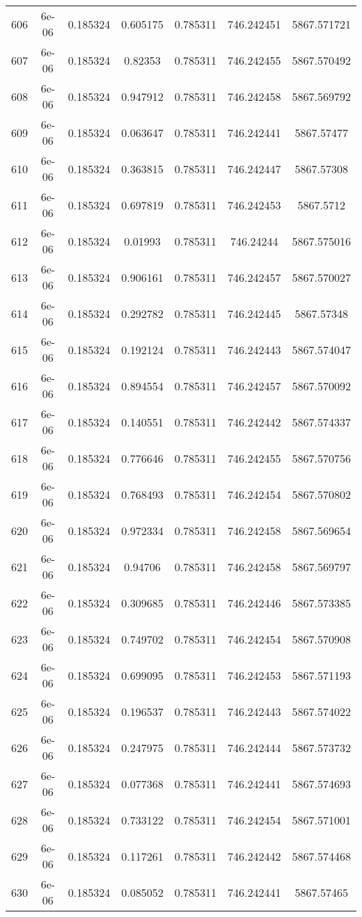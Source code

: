 \begin{table}
\begin{tabular*}{\linewidth}{c|c|c|c|c|c|c}
606 & 6e-06 & 0.185324 & 0.605175 & 0.785311 & 746.242451 & 5867.571721\\
607 & 6e-06 & 0.185324 & 0.82353 & 0.785311 & 746.242455 & 5867.570492\\
608 & 6e-06 & 0.185324 & 0.947912 & 0.785311 & 746.242458 & 5867.569792\\
609 & 6e-06 & 0.185324 & 0.063647 & 0.785311 & 746.242441 & 5867.57477\\
610 & 6e-06 & 0.185324 & 0.363815 & 0.785311 & 746.242447 & 5867.57308\\
611 & 6e-06 & 0.185324 & 0.697819 & 0.785311 & 746.242453 & 5867.5712\\
612 & 6e-06 & 0.185324 & 0.01993 & 0.785311 & 746.24244 & 5867.575016\\
613 & 6e-06 & 0.185324 & 0.906161 & 0.785311 & 746.242457 & 5867.570027\\
614 & 6e-06 & 0.185324 & 0.292782 & 0.785311 & 746.242445 & 5867.57348\\
615 & 6e-06 & 0.185324 & 0.192124 & 0.785311 & 746.242443 & 5867.574047\\
616 & 6e-06 & 0.185324 & 0.894554 & 0.785311 & 746.242457 & 5867.570092\\
617 & 6e-06 & 0.185324 & 0.140551 & 0.785311 & 746.242442 & 5867.574337\\
618 & 6e-06 & 0.185324 & 0.776646 & 0.785311 & 746.242455 & 5867.570756\\
619 & 6e-06 & 0.185324 & 0.768493 & 0.785311 & 746.242454 & 5867.570802\\
620 & 6e-06 & 0.185324 & 0.972334 & 0.785311 & 746.242458 & 5867.569654\\
621 & 6e-06 & 0.185324 & 0.94706 & 0.785311 & 746.242458 & 5867.569797\\
622 & 6e-06 & 0.185324 & 0.309685 & 0.785311 & 746.242446 & 5867.573385\\
623 & 6e-06 & 0.185324 & 0.749702 & 0.785311 & 746.242454 & 5867.570908\\
624 & 6e-06 & 0.185324 & 0.699095 & 0.785311 & 746.242453 & 5867.571193\\
625 & 6e-06 & 0.185324 & 0.196537 & 0.785311 & 746.242443 & 5867.574022\\
626 & 6e-06 & 0.185324 & 0.247975 & 0.785311 & 746.242444 & 5867.573732\\
627 & 6e-06 & 0.185324 & 0.077368 & 0.785311 & 746.242441 & 5867.574693\\
628 & 6e-06 & 0.185324 & 0.733122 & 0.785311 & 746.242454 & 5867.571001\\
629 & 6e-06 & 0.185324 & 0.117261 & 0.785311 & 746.242442 & 5867.574468\\
630 & 6e-06 & 0.185324 & 0.085052 & 0.785311 & 746.242441 & 5867.57465\\
\end{tabular*}
\end{table}
